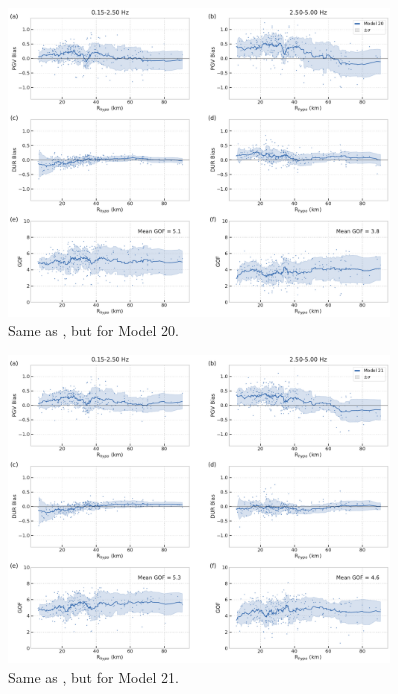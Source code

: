 \begin{figure}[!ht]
  \centering
  \includegraphics[width=0.9\textwidth,height=0.9\textheight,keepaspectratio]{figures/figure_highf_S30.pdf}
  \caption{Same as , but for Model 20.
  }
\label{fig:highf-A30}
\end{figure}
\clearpage


\begin{figure}[!ht]
  \centering
  \includegraphics[width=0.9\textwidth,height=0.9\textheight,keepaspectratio]{figures/figure_highf_S31.pdf}
  \caption{Same as , but for Model 21.
  }
\label{fig:highf-A31}
\end{figure}
\clearpage


